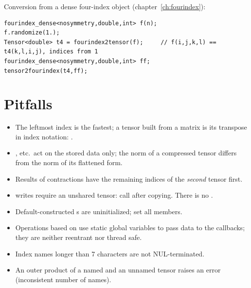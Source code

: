 Conversion from a dense four-index object (chapter~\ref{ch:fourindex}):
\begin{lstlisting}
fourindex_dense<nosymmetry,double,int> f(n);
f.randomize(1.);
Tensor<double> t4 = fourindex2tensor(f);     // f(i,j,k,l) == t4(k,l,i,j), indices from 1
fourindex_dense<nosymmetry,double,int> ff;
tensor2fourindex(t4,ff);
\end{lstlisting}

\section{Pitfalls}\label{sec:tensor:pitfalls}

\begin{itemize}
\item The leftmost index is the fastest; a tensor built from a matrix is its transpose in index notation:
	.
\item {},  etc.\ act on the stored data only; the norm of a compressed tensor
	differs from the norm of its flattened form.
\item Results of contractions have the remaining indices of the \emph{second} tensor first.
\item {} writes require an unshared tensor: call  after copying.
	There is no .
\item Default-constructed s are uninitialized; set all members.
\item Operations based on  use static global variables to pass data to the callbacks;
	they are neither reentrant nor thread safe.
\item Index names longer than 7 characters are not NUL-terminated.
\item An outer product of a named and an unnamed tensor raises an error (inconsistent number of names).
\end{itemize}

